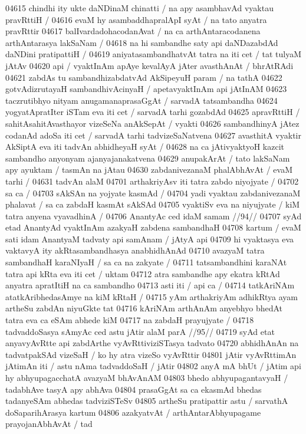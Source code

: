 04615 chindhi ity ukte daNDinaM chinatti / na apy asambhavAd vyaktau pravRttiH /
04616 evaM hy asambaddhapralApI syAt / na tato anyatra pravRttir
04617 balIvardadohacodanAvat / na ca arthAntaracodanena arthAntarasya lakSaNam /
04618 na hi sambandhe saty api daNDazabdAd daNDini pratipattiH /  
04619 aniyatasambandhatvAt tatra na iti cet / tat tulyaM jAtAv  
04620 api / vyaktInAm apAye kevalAyA jAter avasthAnAt / bhrAtRAdi
04621 zabdAs tu sambandhizabdatvAd AkSipeyuH param / na tathA  
04622 gotvAdizrutayaH sambandhivAcinyaH / apetavyaktInAm api jAtInAM
04623 taczrutibhyo nityam anugamanaprasaGgAt / sarvadA tatsambandha 
04624 yogyatApratIter iSTam eva iti cet / sarvadA tarhi gozabdAd 
04625 apravRttiH / sahitAsahitAvasthayor vizeSeNa anAkSepAt / vyakti  
04626 sambandhinyA jAtez codanAd adoSa iti cet / sarvadA tarhi tadvizeSaNatvena
04627 avasthitA vyaktir AkSiptA eva iti tadvAn abhidheyaH syAt /  
04628 na ca jAtivyaktyoH kazcit sambandho anyonyam ajanyajanakatvena 
04629 anupakArAt / tato lakSaNam apy ayuktam / tasmAn na jAtau  
04630 zabdanivezanaM phalAbhAvAt / evaM tarhi / 
04631 tadvAn alaM  
04701 arthakriyAsv iti tatra zabdo niyojyate /
04702 	sa ca / 
04703 	sAkSAn na yojyate kasmAd /
04704 yadi vyaktau zabdanivezanaM phalavat / sa ca zabdaH kasmAt sAkSAd 
04705 vyaktiSv eva na niyujyate / kiM tatra anyena vyavadhinA / 
04706 	AnantyAc ced idaM samam //94// 
04707 syAd etad AnantyAd vyaktInAm azakyaH zabdena sambandhaH  
04708 kartum / evaM sati idam AnantyaM tadvaty api samAnam / jAtyA api
04709 hi vyaktasya eva vaktavyA ity akRtasambandhasya anabhidhAnAd 
04710 avazyaM tatra sambandhaH karaNIyaH / sa ca na zakyate /
04711 tatsambandhini karaNAt tatra api kRta eva iti cet / uktam
04712 atra sambandhe apy ekatra kRtAd anyatra apratItiH na ca sambandho 
04713 asti iti / api ca / 
04714 	tatkAriNAm atatkAribhedasAmye na kiM kRtaH /  
04715 yAm arthakriyAm adhikRtya ayam artheSu zabdAn niyuGkte tat
04716 kAriNAm arthAnAm anyebhyo bhedAt tatra eva ca eSAm abhede kiM 
04717 na zabdaH prayujyate / 
04718 	tadvaddoSasya sAmyAc ced astu jAtir alaM parA //95//
04719 syAd etat anyavyAvRtte api zabdArthe vyAvRttiviziSTasya tadvato  
04720 abhidhAnAn na tadvatpakSAd vizeSaH / ko hy atra vizeSo vyAvRttir  
04801 jAtir vyAvRttimAn jAtimAn iti / astu nAma tadvaddoSaH / jAtir  
04802 anyA mA bhUt / jAtim api hy abhyupagacchatA avazyaM bhAvAnAM
04803 bhedo abhyupagantavyaH / tadabhAve tasyA apy abhAva
04804 prasaGgAt sa ca ekasmAd bhedas tadanyeSAm abhedas tadviziSTeSv 
04805 artheSu pratipattir astu / sarvathA doSaparihArasya kartum 
04806 azakyatvAt / arthAntarAbhyupagame prayojanAbhAvAt / tad
